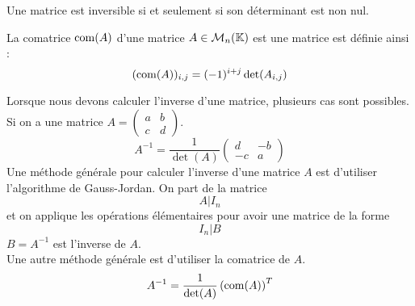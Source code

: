 \begin{proposition}
	Une matrice est inversible si et seulement si son déterminant est non nul.
\end{proposition}

\begin{definition}[Comatrice]
	La comatrice $\operatorname{com}(A)$ d'une matrice $A \in \mathcal{M}_n(\mathbb{K})$ est une matrice est définie ainsi :
	\[ (\operatorname{com}(A))_{i,j} = (-1)^{i+j} \det(A_{i,j}) \]
\end{definition}

\par Lorsque nous devons calculer l'inverse d'une matrice, plusieurs cas sont possibles.
Si on a une matrice
$A =
\begin{pmatrix}
	a & b \\
	c & d
\end{pmatrix}
$.
\[
A^{-1} = \frac{1}{\det(A)} 
\begin{pmatrix}
	d & -b \\
	-c & a
\end{pmatrix}
\]
Une méthode générale pour calculer l'inverse d'une matrice $A$ est d'utiliser l'algorithme de Gauss-Jordan.
On part de la matrice 
\[ A|I_n \]
et on applique les opérations élémentaires pour avoir une matrice de la forme
\[I_n|B\]
$B = A^{-1}$ est l'inverse de $A$.
\\
Une autre méthode générale est d'utiliser la comatrice de $A$.
\[ A^{-1} = \frac{1}{\det(A)} \left( \operatorname{com}(A) \right)^T \]

